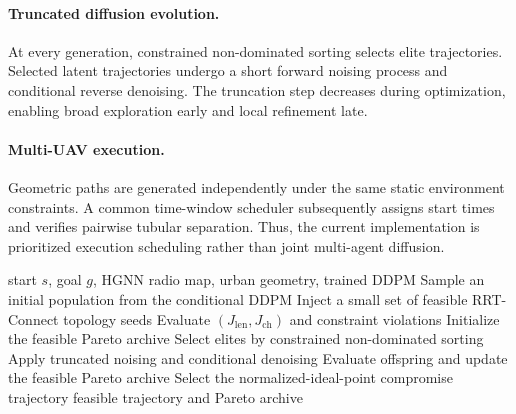 \paragraph{Truncated diffusion evolution.}
At every generation, constrained non-dominated sorting selects elite trajectories. Selected latent
trajectories undergo a short forward noising process and conditional reverse denoising. The truncation
step decreases during optimization, enabling broad exploration early and local refinement late.

\paragraph{Multi-UAV execution.}
Geometric paths are generated independently under the same static environment constraints. A common
time-window scheduler subsequently assigns start times and verifies pairwise tubular separation. Thus,
the current implementation is prioritized execution scheduling rather than joint multi-agent diffusion.

\begin{algorithm}[t]
\caption{CA-Diffusion-ES}
\label{alg:cades}
\begin{algorithmic}[1]
\REQUIRE start $s$, goal $g$, HGNN radio map, urban geometry, trained DDPM
\STATE Sample an initial population from the conditional DDPM
  \STATE Inject a small set of feasible RRT-Connect topology seeds
\ENDIF
\STATE Evaluate $(J_{\mathrm{len}},J_{\mathrm{ch}})$ and constraint violations
\STATE Initialize the feasible Pareto archive
  \STATE Select elites by constrained non-dominated sorting
  \STATE Apply truncated noising and conditional denoising
  \STATE Evaluate offspring and update the feasible Pareto archive
\ENDFOR
\STATE Select the normalized-ideal-point compromise trajectory
\RETURN feasible trajectory and Pareto archive
\end{algorithmic}
\end{algorithm}